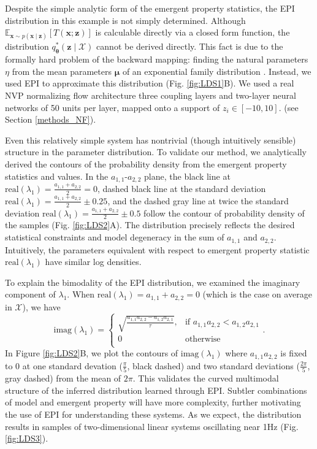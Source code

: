 \documentclass[11pt]{article}
\begin{document}
Despite the simple analytic form of the emergent property statistics, the EPI distribution in this example is not simply determined.
Although $\mathbb{E}_{\mathbf{x}\sim p(\mathbf{x} \mid \mathbf{z})}\left[T(\mathbf{x}; \mathbf{z})\right]$ is calculable directly via a closed form function, the distribution $q^*_{\bm{\theta}}(\mathbf{z} \mid \mathcal{X})$ cannot be derived directly.  
This fact is due to the formally hard problem of the backward mapping: finding the natural parameters $\eta$ from the mean parameters $\bm{\mu}$ of an exponential family distribution \cite{wainwright2008graphical}.  
Instead, we used EPI to approximate this distribution (Fig. \ref{fig:LDS1}B). 
We used a real NVP normalizing flow architecture three coupling layers and two-layer neural networks of 50 units per layer, mapped onto a support of $z_i \in \left[-10, 10 \right]$. (see Section \ref{methods_NF}).

Even this relatively simple system has nontrivial (though intuitively sensible) structure in the parameter distribution.  
To validate our method, we analytically derived the contours of the probability density from the emergent property statistics and values.
In the $a_{1,1}$-$a_{2,2}$ plane, the black line at $\text{real}(\lambda_1) = \frac{a_{1,1} + a_{2,2}}{2} = 0$, dashed black line at
the standard deviation $\text{real}(\lambda_1) = \frac{a_{1,1} + a_{2,2}}{2} \pm 0.25$, and the dashed gray line at twice the standard deviation
$\text{real}(\lambda_1) = \frac{a_{1,1} + a_{2,2}}{2} \pm 0.5$ follow the contour of probability density of the samples (Fig. \ref{fig:LDS2}A). 
The distribution precisely reflects the desired statistical constraints and model degeneracy in the sum of $a_{1,1}$ and $a_{2,2}$.
Intuitively, the parameters equivalent with respect to emergent property statistic $\text{real}(\lambda_1)$ have similar log densities.

To explain the bimodality of the EPI distribution, we examined the imaginary component of $\lambda_1$.  
When $\text{real}(\lambda_1) = a_{1,1} + a_{2,2} = 0$ (which is the case on average in $\mathcal{X}$), we have
\begin{equation}
\text{imag}(\lambda_1) = \begin{cases}
                             \sqrt{\frac{a_{1,1} a_{2,2} - a_{1,2} a_{2,1}}{\tau}},  & \text{if } a_{1,1} a_{2,2} < a_{1,2} a_{2,1} \\
                             0 & \text{otherwise } \\
                         \end{cases}.
\end{equation}
In Figure \ref{fig:LDS2}B, we plot the contours of $\text{imag}(\lambda_1)$ where $a_{1,1} a_{2,2}$ is fixed to 0 at one standard devation ($\frac{\pi}{5}$, black dashed) and two standard deviations ($\frac{2\pi}{5}$, gray dashed) from the mean of $2 \pi$.
This validates the curved multimodal structure of the inferred distribution learned through EPI.  
Subtler combinations of model and emergent property will have more complexity, further motivating the use of EPI for understanding these systems.  
As we expect, the distribution results in samples of two-dimensional linear systems oscillating near 1Hz (Fig. \ref{fig:LDS3}).
\end{document}
